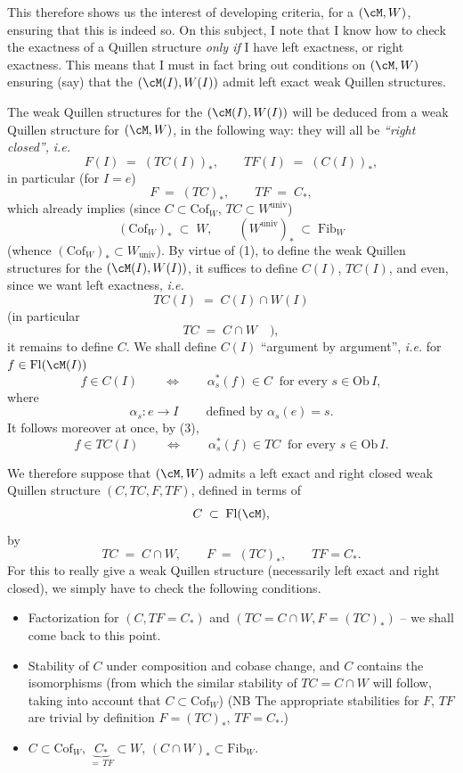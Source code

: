 This therefore shows us the interest of developing criteria, for a $(\cM,W)$, ensuring that this is indeed so. On this subject, I note that I know how to check the exactness of a Quillen structure \textit{only if} I have left exactness, or right exactness. This means that I must in fact bring out conditions on $(\cM,W)$ ensuring (say) that the $(\cM(I),W(I))$ admit left exact weak Quillen structures.

The weak Quillen structures for the $(\cM(I),W(I))$ will be deduced from a weak Quillen structure for $(\cM,W)$, in the following way: they will all be \textit{``right closed'',} \textit{i.e.}
\[
F(I) \;=\; (TC(I))_*, \qquad TF(I) \;=\; (C(I))_*, \tag*{(1)}
\]
in particular (for $I=e$)
\[
F \;=\; (TC)_*, \qquad TF \;=\; C_*,
\]
which already implies (since $C\subset \mathrm{Cof}_W$, $TC\subset W^{\mathrm{univ}}$)
\[
(\mathrm{Cof}_W)_* \;\subset\; W, \qquad (W^{\mathrm{univ}})_* \;\subset\; \mathrm{Fib}_W \tag*{(2)}
\]
(whence $(\mathrm{Cof}_W)_*\subset W_{\mathrm{univ}}$). By virtue of (1), to define the weak Quillen structures for the $(\cM(I),W(I))$, it suffices to define $C(I)$, $TC(I)$, and even, since we want left exactness, \textit{i.e.}
\[
TC(I) \;=\; C(I)\cap W(I) \tag*{(3)}
\]
(in particular
\[
TC \;=\; C\cap W \quad ), \tag*{(4)}
\]
it remains to define $C$. We shall define $C(I)$ ``argument by argument'', \textit{i.e.} for $f\in\mathrm{Fl}(\cM(I))$
\[
f\in C(I) \qquad\Longleftrightarrow\qquad \alpha_s^*(f)\in C \ \text{ for every } s\in\mathrm{Ob}\,I, \tag*{(5)}
\]
where
\[
\alpha_s : e\longrightarrow I \qquad \ \text{defined by } \alpha_s(e)=s.
\]
It follows moreover at once, by (3),
\[
f\in TC(I) \qquad\Longleftrightarrow\qquad \alpha_s^*(f)\in TC \ \text{ for every } s\in\mathrm{Ob}\,I. \tag*{(6)}
\]

We therefore suppose that $(\cM,W)$ admits a left exact and right closed weak Quillen structure $(C,TC,F,TF)$, defined in terms of
\[
C\;\subset\;\mathrm{Fl}(\cM),
\]
by
\[
TC \;=\; C\cap W, \qquad F \;=\; (TC)_*, \qquad TF = C_*.
\]
For this to really give a weak Quillen structure (necessarily left exact and right closed), we simply have to check the following conditions.

\begin{itemize}[leftmargin=3em]
\item[\circled{i}] Factorization for $(C, TF=C_*)$ and $(TC=C\cap W, F=(TC)_*)$ – we shall come back to this point.
\item[\circled{ii}] Stability of $C$ under composition and cobase change, and $C$ contains the isomorphisms (from which the similar stability of $TC = C\cap W$ will follow, taking into account that $C\subset\mathrm{Cof}_W$) (NB The appropriate stabilities for $F$, $TF$ are trivial by definition $F=(TC)_*$, $TF=C_*$.)
\item[\circled{iii}] $C\subset\mathrm{Cof}_W$, $\underbrace{C_*}_{=\,TF}\subset W$, $(C\cap W)_*\subset\mathrm{Fib}_W$.
\end{itemize}


